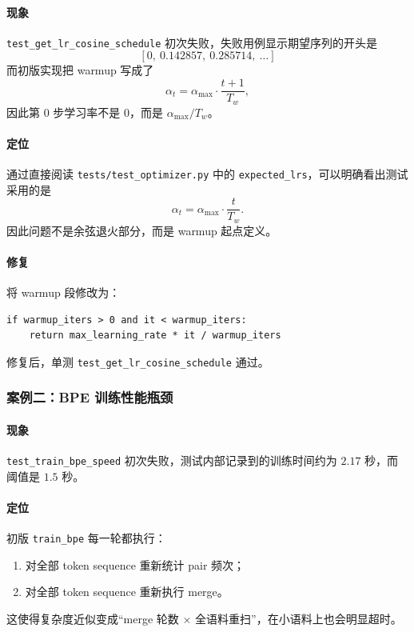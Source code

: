 \documentclass[UTF8,a4paper,11pt]{ctexart}
\begin{document}
\paragraph{现象}
\texttt{test\_get\_lr\_cosine\_schedule} 初次失败，失败用例显示期望序列的开头是
\[
[0,\ 0.142857,\ 0.285714,\ \dots]
\]
而初版实现把 warmup 写成了
\[
\alpha_t = \alpha_{\max}\cdot\frac{t+1}{T_w},
\]
因此第 \(0\) 步学习率不是 \(0\)，而是 \(\alpha_{\max}/T_w\)。

\paragraph{定位}
通过直接阅读 \texttt{tests/test\_optimizer.py} 中的 \texttt{expected\_lrs}，可以明确看出测试采用的是
\[
\alpha_t = \alpha_{\max}\cdot\frac{t}{T_w}.
\]
因此问题不是余弦退火部分，而是 warmup 起点定义。

\paragraph{修复}
将 warmup 段修改为：
\begin{lstlisting}
if warmup_iters > 0 and it < warmup_iters:
    return max_learning_rate * it / warmup_iters
\end{lstlisting}
修复后，单测
\texttt{test\_get\_lr\_cosine\_schedule} 通过。

\subsubsection{案例二：BPE 训练性能瓶颈}
\paragraph{现象}
\texttt{test\_train\_bpe\_speed} 初次失败，测试内部记录到的训练时间约为 \(2.17\) 秒，而阈值是 \(1.5\) 秒。

\paragraph{定位}
初版 \texttt{train\_bpe} 每一轮都执行：
\begin{enumerate}[leftmargin=2em]
  \item 对全部 token sequence 重新统计 pair 频次；
  \item 对全部 token sequence 重新执行 merge。
\end{enumerate}
这使得复杂度近似变成“merge 轮数 \(\times\) 全语料重扫”，在小语料上也会明显超时。
\end{document}
